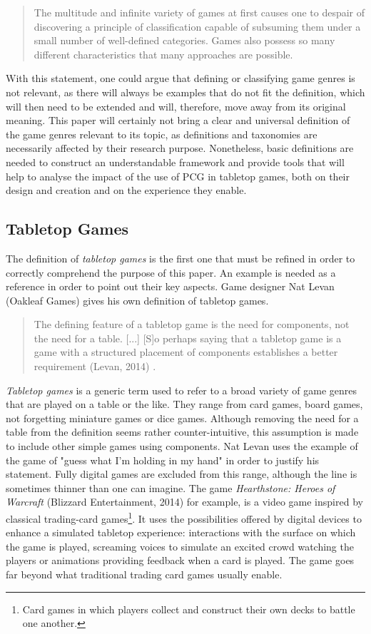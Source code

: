 \begin{quotation}
The multitude and infinite variety of games at first causes one to despair of discovering a principle of classification capable of subsuming them under a small number of well-defined categories. Games also possess so many different characteristics that many approaches are possible.
\end{quotation}

With this statement, one could argue that defining or classifying game genres is not relevant, as there will always be examples that do not fit the definition, which will then need to be extended and will, therefore, move away from its original meaning. This paper will certainly not bring a clear and universal definition of the game genres relevant to its topic, as definitions and taxonomies are necessarily affected by their research purpose. Nonetheless, basic definitions are needed to construct an understandable framework and provide tools that will help to analyse the impact of the use of PCG in tabletop games, both on their design and creation and on the experience they enable.

\subsection{Tabletop Games}
The definition of \textit{tabletop games} is the first one that must be refined in order to correctly comprehend the purpose of this paper. An example is needed as a reference in order to point out their key aspects. Game designer Nat Levan (Oakleaf Games) gives his own definition of tabletop games. 

\begin{quotation}
The defining feature of a tabletop game is the need for components, not the need for a table. [...] [S]o perhaps saying that a tabletop game is a game with a structured placement of components establishes a better requirement (Levan, 2014) \cite{web:oak}.
\end{quotation}

\textit{Tabletop games} is a generic term used to refer to a broad variety of game genres that are played on a table or the like. They range from card games, board games, not forgetting miniature games or dice games. Although removing the need for a table from the definition seems rather counter-intuitive, this assumption is made to include other simple games using components. 
Nat Levan uses the example of the game of "guess what I'm holding in my hand" \cite{web:oak} in order to justify his statement. Fully digital games are excluded from this range, although the line is sometimes thinner than one can imagine. The game \textit{Hearthstone: Heroes of Warcraft} (Blizzard Entertainment, 2014) \cite{game:hs} for example, is a video game inspired by classical trading-card games\footnote{Card games in which players collect and construct their own decks to battle one another.}. It uses the possibilities offered by digital devices to enhance a simulated tabletop experience: interactions with the surface on which the game is played, screaming voices to simulate an excited crowd watching the players or animations providing feedback when a card is played. The game goes far beyond what traditional trading card games usually enable.

